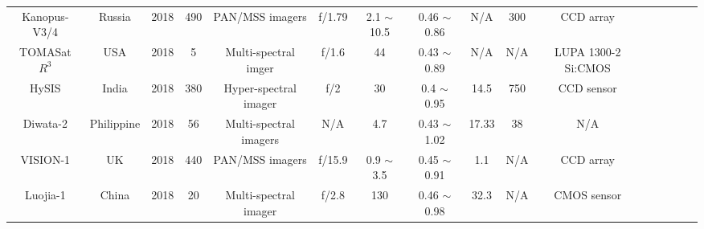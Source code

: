 \documentclass[final,5p,times,twocolumn,authoryear]{elsarticle}
\begin{document}
\begin{table}
{\begin{tabular}{c c c c c c c c c c c c c c c c}
 		   Kanopus-V3/4 & Russia & 2018 & 490 & PAN/MSS imagers & f/1.79 & 2.1 $\sim$ 10.5 & 0.46 $\sim$ 0.86 &  N/A & 300 &  CCD array & \citep{spacef2018}\\
 		   TOMASat $R^3$ & USA & 2018 & 5 & Multi-spectral imger & f/1.6 & 44 & 0.43 $\sim$ 0.89 &  N/A & N/A &  LUPA 1300-2 Si:CMOS & \citep{eoportal}\\ 
 		   HySIS & India & 2018 & 380 & Hyper-spectral imager & f/2 & 30 & 0.4 $\sim$ 0.95 &  14.5 & 750 &  CCD sensor & \citep{sita2019automatic} \\
 		   Diwata-2 & Philippine & 2018 & 56 & Multi-spectral imagers & N/A & 4.7 & 0.43 $\sim$ 1.02 &  17.33 & 38 & N/A & \citep{violan2021flight}\\ 
 		   VISION-1 & UK & 2018 & 440 & PAN/MSS imagers & f/15.9 & 0.9 $\sim$ 3.5 & 0.45 $\sim$ 0.91 & 1.1 & N/A &CCD array  &\citep{eoportal}\\ 
 		   Luojia-1 & China & 2018 & 20 & Multi-spectral imager & f/2.8 & 130 & 0.46 $\sim$ 0.98 &  32.3 &  N/A & CMOS sensor & \citep{jiang2018potentiality} \\
 		  	    	    	    	                      	       	    	    	    	        	           		    		      		       	    
		\hline
		\end{tabular}
	}
\label{table:nonlin} %
\end{table}
\end{document}
